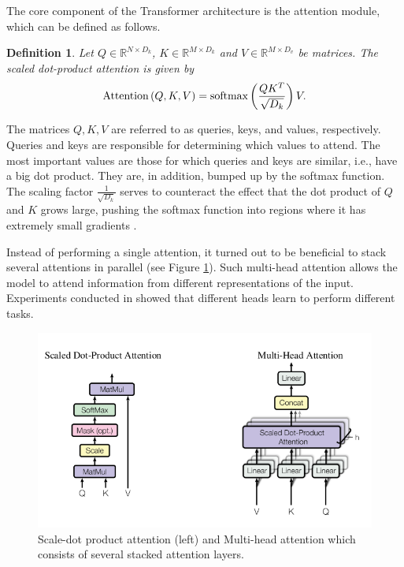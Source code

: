\documentclass[magisterska,en]{pracamgr}
\newtheorem{defi}{Definition}[section]
\begin{document}
The core component of the Transformer architecture is the attention module, which can be defined as follows.

\begin{defi}\label{attention_def}
    Let $Q \in \mathbb{R}^{N\times D_k}$, $K \in \mathbb{R}^{M\times D_k}$ and $V \in \mathbb{R}^{M\times D_v}$ be matrices. The scaled dot-product attention is given by
        \begin{equation*}
        \normalfont
        \textrm{Attention} \left( Q, K, V \right) = \textrm{softmax}\left(\frac{QK^T}{\sqrt{D_k}} \right) V.
    \end{equation*}

\end{defi}

The matrices $Q, K, V$ are referred to as queries, keys, and values, respectively. Queries and keys are responsible for determining which values to attend. The most important values are those for which queries and keys are similar, i.e., have a big dot product. They are, in addition, bumped up by the softmax function. The scaling factor $\frac{1}{\sqrt{D_k}}$ serves to counteract the effect that the dot product of $Q$ and $K$ grows large, pushing the softmax function into regions where it has extremely small gradients \cite{DBLP:conf/nips/VaswaniSPUJGKP17}.

Instead of performing a single attention, it turned out to be beneficial to stack several attentions in parallel (see Figure \ref{multi-head}). Such multi-head attention allows the model to attend information from different representations of the input. Experiments conducted in \cite{DBLP:conf/nips/VaswaniSPUJGKP17} showed that different heads learn to perform different tasks.

\begin{figure}[H]
\centering
\includegraphics[scale=0.6]{images/attention_module.png}
\caption{Scale-dot product attention (left) and Multi-head attention which consists of several stacked attention layers.}
\label{multi-head}
\end{figure}
\end{document}
